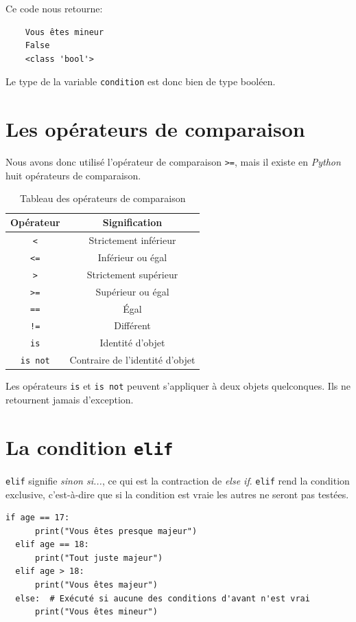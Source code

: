 \documentclass[a4paper,11pt]{book}
\begin{document}
Ce code nous retourne:
\begin{verbatim}
    Vous êtes mineur
    False
    <class 'bool'>
\end{verbatim}
\medskip

Le type de la variable \texttt{condition} est donc bien de type booléen.
\medskip

\section{Les opérateurs de comparaison}
Nous avons donc utilisé l'opérateur de comparaison \texttt{>=}, mais il existe en \textit{Python} huit opérateurs de comparaison.
\begin{table}[h]
\begin{center}
\begin{tabular}{|c|c|}
\hline
\textbf{Opérateur} & \textbf{Signification} \\
\hline
\texttt{<} & Strictement inférieur \\
\hline
\texttt{<=} & Inférieur ou égal \\
\hline
\texttt{>} & Strictement supérieur \\
\hline
\texttt{>=} & Supérieur ou égal \\
\hline
\texttt{==} & Égal \\
\hline
\texttt{!=} & Différent \\
\hline
\texttt{is} & Identité d'objet \\
\hline
\texttt{is not} & Contraire de l'identité d'objet \\
\hline 
\end{tabular}
\caption{Tableau des opérateurs de comparaison}
\end{center}
\end{table}
\medskip

Les opérateurs \texttt{is} et \texttt{is not} peuvent s'appliquer à deux objets quelconques. Ils ne retournent jamais d'exception.
\medskip

\section{La condition \texttt{elif}}
\texttt{elif} signifie \textit{sinon si...}, ce qui est la contraction de \textit{else if}. \texttt{elif} rend la condition exclusive, c'est-à-dire que si la condition est vraie les autres ne seront pas testées.
\begin{lstlisting}[caption=Sinon...si]
  if age == 17:
  	  print("Vous êtes presque majeur")
  elif age == 18:
  	  print("Tout juste majeur")
  elif age > 18:
  	  print("Vous êtes majeur")
  else:  # Exécuté si aucune des conditions d'avant n'est vrai
  	  print("Vous êtes mineur")
\end{lstlisting}
\medskip
\end{document}
